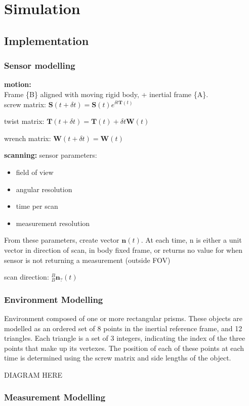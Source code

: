 \chapter{Simulation}
\section{Implementation}
\subsection{Sensor modelling}
\textbf{motion:}\\
Frame \{B\} aligned with moving rigid body, + inertial frame \{A\}.\\
screw matrix: $\mathbf{S}(t+\delta t) = \mathbf{S}(t)e^{\delta t {\mathbf{T}(t)}}$
			
twist matrix: $\mathbf{T}(t+\delta t) = \mathbf{T}(t) + \delta t \mathbf{W}(t)$

wrench matrix: $\mathbf{W}(t+\delta t) =\mathbf{W}(t)$

\textbf{scanning:}
sensor parameters:
\begin{itemize}
\item field of view
\item angular resolution
\item time per scan
\item measurement resolution
\end{itemize}
From these parameters, create vector $\mathbf{n}(t)$. At each time, n is either a unit vector in direction of scan, in body fixed frame, or returns no value for when sensor is not returning a measurement (outside FOV)

scan direction: ${^{B}_{B}\mathbf{n}^{}_{?}}(t)$

\subsection{Environment Modelling}
Environment composed of one or more rectangular prisms. These objects are modelled as an ordered set of 8 points in the inertial reference frame, and 12 triangles. Each triangle is a set of 3 integers, indicating the index of the three points that make up its vertexes.
The position of each of these points at each time is determined using the screw matrix and side lengths of the object.

DIAGRAM HERE

\subsection{Measurement Modelling}
